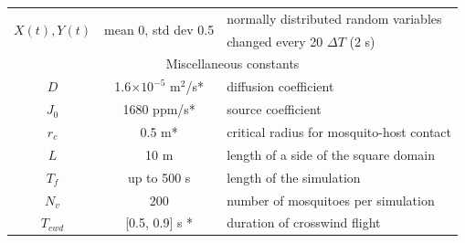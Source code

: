 \documentclass[10pt]{article}
\begin{document}
\begin{table}[!htp]
\begin{center}
\begin{tabular}{|c|c|l|}
			\multirow{2}{*}{$X(t),Y(t)$} & \multirow{2}{*}{mean 0, std dev 0.5}&
			normally distributed random variables  \\
			& & changed every 20 $\Delta T$ (2 s)\\
			\hline \hline
			\multicolumn{3}{|c|}{Miscellaneous constants} \\
			\hline
			$D$ & 1.6$\times 10^{-5}$ m$^2$/s*& diffusion coefficient\\
			$J_0$ & 1680 ppm/s* & source coefficient\\
			$r_c$ & 0.5 m* & critical radius for mosquito-host contact  \\
			$L$ & 10 m & length of a side of the square domain \\
			$T_f$ & up to 500 s & length of the simulation \\
			$N_v$ & 200 & number of mosquitoes per simulation \\
			$T_{cwd}$ & [0.5, 0.9] s *& 
			duration of crosswind flight  \\
			\hline
		\end{tabular}
	\end{center}\label{tab:finalparams}
\end{table}
\end{document}
